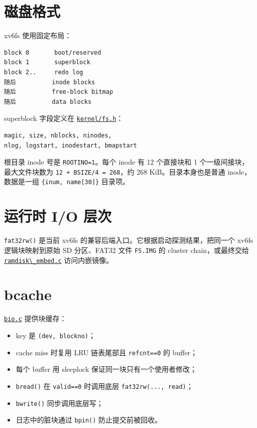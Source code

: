 \section{磁盘格式}\label{ux78c1ux76d8ux683cux5f0f}

xv6fs 使用固定布局：

\begin{lstlisting}
block 0       boot/reserved
block 1       superblock
block 2..     redo log
随后          inode blocks
随后          free-block bitmap
随后          data blocks
\end{lstlisting}

superblock 字段定义在
\href{../../../kernel/fs.h}{\passthrough{\lstinline!kernel/fs.h!}}：

\begin{lstlisting}
magic, size, nblocks, ninodes,
nlog, logstart, inodestart, bmapstart
\end{lstlisting}

根目录 inode 号是 \passthrough{\lstinline!ROOTINO=1!}。每个 inode 有 12
个直接块和 1 个一级间接块， 最大文件块数为
\passthrough{\lstinline!12 + BSIZE/4 = 268!}，约 268
KiB。目录本身也是普通 inode， 数据是一组
\passthrough{\lstinline!\{inum, name[30]\}!} 目录项。

\section{运行时 I/O 层次}\label{ux8fd0ux884cux65f6-io-ux5c42ux6b21}



\passthrough{\lstinline!fat32rw()!} 是当前 xv6fs
的兼容后端入口。它根据启动探测结果，把同一个 xv6fs 逻辑块映射到原始 SD
分区、FAT32 文件 \passthrough{\lstinline!FS.IMG!} 的 cluster
chain，或最终交给
\href{../../../kernel/drivers/block/ramdisk_embed.c}{\passthrough{\lstinline!ramdisk\_embed.c!}}
访问内嵌镜像。

\section{bcache}\label{bcache}

\href{../../../kernel/bio.c}{\passthrough{\lstinline!bio.c!}}
提供块缓存：

\begin{itemize}
\tightlist
\item
  key 是 \passthrough{\lstinline!(dev, blockno)!}；
\item
  cache miss 时复用 LRU 链表尾部且 \passthrough{\lstinline!refcnt==0!}
  的 buffer；
\item
  每个 buffer 用 sleeplock 保证同一块只有一个使用者修改；
\item
  \passthrough{\lstinline!bread()!} 在
  \passthrough{\lstinline!valid==0!} 时调用底层
  \passthrough{\lstinline!fat32rw(..., read)!}；
\item
  \passthrough{\lstinline!bwrite()!} 同步调用底层写；
\item
  日志中的脏块通过 \passthrough{\lstinline!bpin()!} 防止提交前被回收。
\end{itemize}

